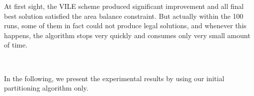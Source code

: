 \documentclass[journal]{IEEEtran}
\begin{document}
At first sight, the VILE scheme produced significant
improvement and all final best solution satisfied the area balance
constraint. But actually within the 100 runs, some of them in fact
could not produce legal solutions, and whenever this happens, the
algorithm stops very quickly and consumes only very small amount of time.

\ 

In the following, we present the
experimental results by using our initial partitioning algorithm only.

\end{document}
